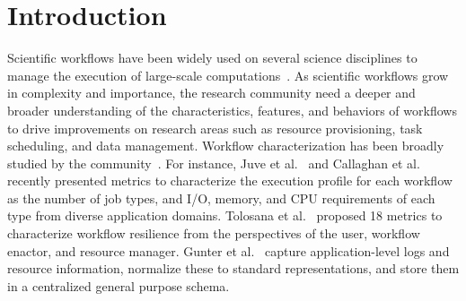 
\section{Introduction}
\label{intro}

Scientific workflows have been widely used on several science disciplines to manage the execution of large-scale computations~\cite{Deelman2002,Sakellariou2010,Lathers2006,Oinn2004,Wieczorek2005,Maechling2007}. 
As scientific workflows grow in complexity and importance, the research community need a deeper and broader understanding of the characteristics, features, and behaviors of workflows to drive improvements on research areas such as resource provisioning, task scheduling, and data management. 
Workflow characterization has been broadly studied by the community~\cite{Juve2013, Calasanz2008, Tolosana2011, Callaghan2011, Gunter2011, Yildiz2009, Ramakrishnan2008, Bharathi2008, Gu2013}. For instance, 
Juve et al.~\cite{Juve2013} and Callaghan et al.~\cite{Callaghan2011} recently presented metrics to characterize the execution profile for each workflow as the number of job types, and I/O, memory, and CPU requirements of each type from diverse application domains. Tolosana et al.~\cite{Tolosana2011} proposed 18 metrics to characterize workflow resilience from the perspectives of the user, workflow enactor, and resource manager. Gunter et al.~\cite{Gunter2011} capture application-level logs and resource information, normalize these to standard representations, and store them in a centralized general purpose schema.

